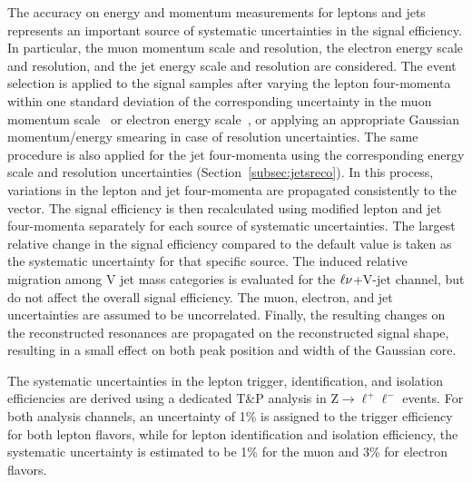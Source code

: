 The accuracy on energy and momentum measurements for leptons and jets represents an important source of systematic uncertainties in the signal efficiency.
In particular, the muon momentum scale and resolution, the electron energy scale and resolution, and the jet energy scale and resolution are considered.
The event selection is applied to the signal samples after varying the lepton four-momenta within one standard deviation of the corresponding uncertainty
in the muon momentum scale~\cite{Chatrchyan:2012xi} or electron energy scale~\cite{Chatrchyan:2013dga}, or applying an appropriate Gaussian momentum/energy smearing in case of resolution uncertainties.
The same procedure is also applied for the jet four-momenta using the corresponding energy scale and resolution uncertainties (Section~\ref{subsec:jetsreco}).
In this process, variations in the lepton and jet four-momenta are propagated consistently to the \VEtmiss vector.
The signal efficiency is then recalculated using modified lepton and jet four-momenta separately for each source of systematic uncertainties.
The largest relative change in the signal efficiency compared to the default value is taken as the systematic uncertainty for that specific source.
The induced relative migration among V jet mass categories is evaluated for the $\ell\nu$+V-jet channel, but do not affect the overall signal efficiency. The muon, electron, and jet uncertainties are assumed to be uncorrelated. 
Finally, the resulting changes on the reconstructed resonances are propagated on the reconstructed \mlvj signal shape, resulting in a small effect on both peak position and width of the Gaussian core. 

The systematic uncertainties in the lepton trigger, identification, and isolation efficiencies are derived using a dedicated T\&P analysis in Z$\rightarrow\ell^+\ell^-$ events.
For both analysis channels, an uncertainty of 1\% is assigned to the trigger efficiency for both lepton flavors,
while for lepton identification and isolation efficiency, the systematic uncertainty is estimated to be 1\% for the muon and 3\% for electron flavors.

